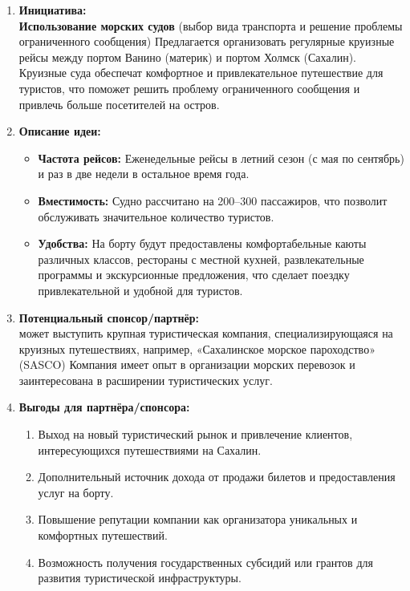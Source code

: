 \documentclass[a4paper,12pt]{article}
\begin{document}
\begin{enumerate}
    \item \textbf{Инициатива:} \\
    \textbf{Использование морских судов} (выбор вида транспорта и решение проблемы ограниченного сообщения) Предлагается организовать регулярные круизные рейсы между портом Ванино (материк) и портом Холмск (Сахалин). Круизные суда обеспечат комфортное и привлекательное путешествие для туристов, что поможет решить проблему ограниченного сообщения и привлечь больше посетителей на остров.
    
    \item \textbf{Описание идеи:}
    \begin{itemize}
        \item \textbf{Частота рейсов:} Еженедельные рейсы в летний сезон (с мая по сентябрь) и раз в две недели в остальное время года.
        \item \textbf{Вместимость:} Судно рассчитано на 200–300 пассажиров, что позволит обслуживать значительное количество туристов.
        \item \textbf{Удобства: } На борту будут предоставлены комфортабельные каюты различных классов, рестораны с местной кухней, развлекательные программы и экскурсионные предложения, что сделает поездку привлекательной и удобной для туристов.
    \end{itemize}
    
    \item \textbf{Потенциальный спонсор/партнёр:} \\
     может выступить крупная туристическая компания, специализирующаяся на круизных путешествиях, например, «Сахалинское морское пароходство» (SASCO) Компания имеет опыт в организации морских перевозок и заинтересована в расширении туристических услуг.
    
    \item \textbf{Выгоды для партнёра/спонсора:}
    \begin{enumerate}
        \item Выход на новый туристический рынок и привлечение клиентов, интересующихся путешествиями на Сахалин.
        \item Дополнительный источник дохода от продажи билетов и предоставления услуг на борту.
        \item Повышение репутации компании как организатора уникальных и комфортных путешествий.
        \item Возможность получения государственных субсидий или грантов для развития туристической инфраструктуры.
    \end{enumerate}
    

\end{enumerate}
\end{document}

